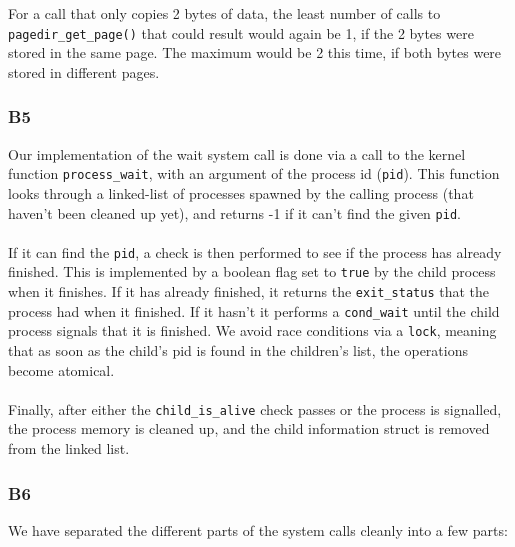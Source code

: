 \documentclass[a4wide, 11pt]{article}
\newcommand{\tx}{\texttt}
\begin{document}
For a call that only copies 2 bytes of data, the least number of calls to \tx{pagedir\_get\_page()} that could result would again be 1, if the 2 bytes were stored in the same page. The maximum would be 2 this time, if both bytes were stored in different pages.

\subsubsection{B5}

Our implementation of the wait system call is done via a call to the kernel function \texttt{process\_wait}, with an argument of the process id (\texttt{pid}). This function looks through a linked-list of processes spawned by the calling process (that haven't been cleaned up yet), and returns -1 if it can't find the given \texttt{pid}.
\\\\
If it can find the \texttt{pid}, a check is then performed to see if the process has already finished. This is implemented by a boolean flag set to \texttt{true} by the child process when it finishes. If it has already finished, it returns the \texttt{exit\_status} that the process had when it finished. If it hasn't it performs a \texttt{cond\_wait} until the child process signals that it is finished. We avoid race conditions via a \texttt{lock}, meaning that as soon as the child's pid is found in the children's list, the operations become atomical.
\\\\
Finally, after either the \texttt{child\_is\_alive} check passes or the process is signalled, the process memory is cleaned up, and the child information struct is removed from the linked list.

\subsubsection{B6}

We have separated the different parts of the system calls cleanly into a few parts:
\end{document}

